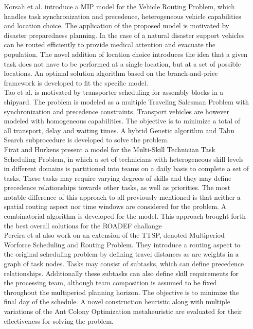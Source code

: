 Korsah et al. \cite{korsahOptimalVehicleRouting2010} introduce a MIP model for the Vehicle Routing Problem, which handles task synchronization and precedence, heterogeneous vehicle capabilities and location choice. The application of the proposed model is motivated by disaster preparedness planning. In the case of a natural disaster support vehicles can be routed efficiently to provide medical attention and evacuate the population. The novel addition of location choice introduces the idea that a given task does not have to be performed at a single location, but at a set of possible locations. An optimal solution algorithm based on the branch-and-price framework is developed to fit the specific model.\\
%
Tao et al. \cite{taoMetaheuristicAlgorithmTransporter2019} is motivated by transporter scheduling for assembly blocks in a shipyard. The problem is modeled as a multiple Traveling Salesman Problem with synchronization and precedence constraints. Transport vehicles are however modeled with homogeneous capabilities. The objective is to minimize a total of all transport, delay and waiting times. A hybrid Genetic algorithm and Tabu Search subprocedure is developed to solve the problem.\\
%
Firat and Hurkens \cite{firatImprovedMIPbasedApproach2012} present a model for the Multi-Skill Technician Task Scheduling Problem, in which a set of technicians with heterogeneous skill levels in different domains is partitioned into teams on a daily basis to complete a set of tasks. These tasks may require varying degrees of skills and they may define precedence relationships towards other tasks, as well as priorities. The most notable difference of this approach to all previously mentioned is that neither a spatial routing aspect nor time windows are considered for the problem. A combinatorial algorithm is developed for the model. This approach brought forth the best overall solutions for the ROADEF challange \cite{dutotTechniciansInterventionsScheduling2006}\\
%
Pereira et al \cite{pereiraMultiperiodWorkforceScheduling2020} also work on an extension of the TTSP, denoted Multiperiod Worforce Scheduling and Routing Problem. They introduce a routing aspect to the original scheduling problem by defining travel distances as arc weights in a graph of task nodes. Tasks may consist of subtasks, which can define precedence relationships. Additionally these subtasks can also define skill requirements for the processing team, although team composition is assumed to be fixed throughout the multiperiod planning horizon. The objective is to minimize the final day of the schedule. A novel construction heuristic along with multiple variations of the Ant Colony Optimization metaheuristic are evaluated for their effectiveness for solving the problem.\\ \\
